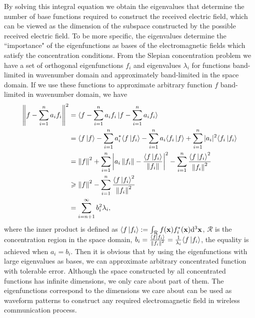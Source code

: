 \documentclass[12pt,draftclsnofoot,journal,onecolumn]{IEEEtran}
\begin{document}
    By solving this integral equation we obtain the eigenvalues that determine the number of base functions required to construct the received electric field, which can be viewed as the dimension of the subspace constructed by the possible received electric field. To be more specific, the eigenvalues determine the {\color{red}``importance"} of the eigenfunctions as bases of the electromagnetic fields which satisfy the concentration conditions. From the Slepian concentration problem we have a set of orthogonal eigenfunctions $f_i$ and eigenvalues $\lambda_i$ for functions band-limited in wavenumber domain and approximately band-limited in the space domain. If we use these functions to approximate arbitrary function $f$ band-limited in wavenumber domain, we have 
		\begin{equation}
	\begin{aligned}
		\left\| f-\sum_{i=1}^n a_i f_i  \right\|^2 &= 
		\langle f-\sum_{i=1}^n a_i f_i \ket{f-\sum_{i=1}^n a_i f_i}
		\\& = \langle f \ket{f} - \sum_{i=1}^n a_i^* \langle f \ket{f_i} -\sum_{i=1}^n a_i \langle f_i \ket{f} + \sum_{i=1}^n |a_i|^2 \langle f_i \ket{f_i}
		\\& = \left\| f \right\|^2 + \sum_{i=1}^n \left| a_i \left\| f_i \right\| - \frac{ \langle f \ket{f_i}}{\left\| f_i \right\|} \right|^2 - \sum_{i=1}^n \frac{ \langle f \ket{f_i}^2}{\left\| f_i \right\|^2}
		\\&\geqslant  \left\| f \right\|^2 - \sum_{i=1}^n \frac{ \langle f \ket{f_i}^2}{\left\| f_i \right\|^2}
		\\&=\sum_{i=n+1}^{\infty} b_i^2 \lambda_i ,
	\end{aligned}
	\label{eqn_min_f_approx}
	\end{equation}
	where the inner product is defined as $\langle f \ket{f_i}:= \int_{\mathcal{R}} f({\bf x}) f_i^*({\bf x}) {\rm d}^3{\bf x}$, $\mathcal{R}$ is the concentration region in the space domain, $b_i = \frac{ \langle f \ket{f_i}}{\left\| f_i \right\|^2}= \frac{1}{\lambda_i} \langle f \ket{f_i}$, the equality is achieved when $a_i=b_i$. Then it is obvious that by using the eigenfunctions with large eigenvalues as bases, we can approximate arbitrary concentrated function with tolerable error. Although the space constructed by all concentrated functions has infinite dimensions, we only care about part of them. The eigenfunctions correspond to the dimensions we care about can be used as waveform patterns to construct any required electromagnetic field in wireless communication process.       
   
\end{document}
